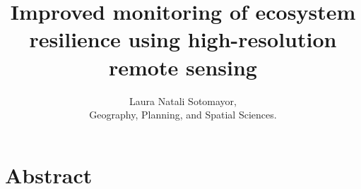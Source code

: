 \documentclass{thesis}
\title{Improved monitoring of ecosystem resilience using high-resolution remote sensing}
\author{Laura Natali Sotomayor, \\
Geography, Planning, and Spatial Sciences.}
\begin{document}
\maketitle
 
\section*{Abstract}




\end{document}
